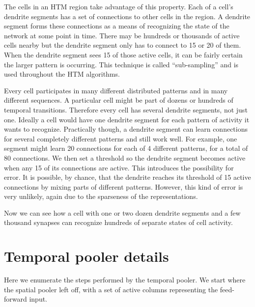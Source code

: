 \documentclass{report}
\begin{document}
The cells in an HTM region take advantage of this property. Each of a
cell's dendrite segments has a set of connections to other cells in
the region. A dendrite segment forms these connections as a means of
recognizing the state of the network at some point in time. There may
be hundreds or thousands of active cells nearby but the dendrite
segment only has to connect to 15 or 20 of them. When the dendrite
segment sees 15 of those active cells, it can be fairly certain the
larger pattern is occurring. This technique is called ``sub-sampling''
and is used throughout the HTM algorithms.

Every cell participates in many different distributed patterns and in
many different sequences. A particular cell might be part of dozens or
hundreds of temporal transitions. Therefore every cell has several
dendrite segments, not just one. Ideally a cell would have one
dendrite segment for each pattern of activity it wants to
recognize. Practically though, a dendrite segment can learn
connections for several completely different patterns and still work
well. For example, one segment might learn 20 connections for each of
4 different patterns, for a total of 80 connections. We then set a
threshold so the dendrite segment becomes active when any 15 of its
connections are active. This introduces the possibility for error. It
is possible, by chance, that the dendrite reaches its threshold of 15
active connections by mixing parts of different patterns. However,
this kind of error is very unlikely, again due to the sparseness of
the representations.

Now we can see how a cell with one or two dozen dendrite segments and
a few thousand synapses can recognize hundreds of separate states of
cell activity.

\section*{Temporal pooler details}

Here we enumerate the steps performed by the temporal pooler. We start
where the spatial pooler left off, with a set of active columns
representing the feed-forward input.
\end{document}
